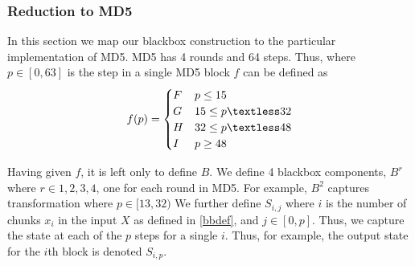 \subsubsection{Reduction to MD5} \label{sec:reducmd5}

In this section we map our blackbox construction to the particular implementation of MD5. MD5 has 4 rounds and 64 steps. Thus, where $p \in [0,63]$ is the step in a single MD5 block $f$ can be defined as 
$$  f(p) = 
\begin{cases} 
      F &   p \leq 15 \\
      G &  15 \leq p \textless 32 \\
      H &  32 \leq p \textless 48 \\
      I   &  p \geq 48 \\
      
\end{cases}
 $$
 
Having given $f$, it is left only to define $B$. We define 4 blackbox components, $B^r$ where $r \in {1,2,3,4}$, one for each round in MD5. For example, $B^2$ captures transformation where $p \in [13,32)$  We further define $S_{i,j}$ where $i$ is the number of chunks $x_i$ in the input $X$ as defined in \ref{bbdef}, and $j \in [0,p]$. Thus, we capture the state at each of the $p$ steps for a single $i$. Thus, for example, the output state for the $i$th block is denoted $S_{i,p}$. 

